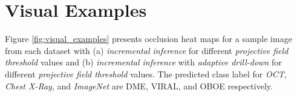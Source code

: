 \section{Visual Examples}

Figure \ref{fig:visual_examples} presents occlusion heat maps for a sample image from each dataset with (a) \textit{incremental inference} for different \textit{projective field threshold} values and (b) \textit{incremental inference} with \textit{adaptive drill-down} for different \textit{projective field threshold} values. The predicted class label for \textit{OCT}, \textit{Chest X-Ray}, and \textit{ImageNet} are DME, VIRAL, and OBOE respectively.

